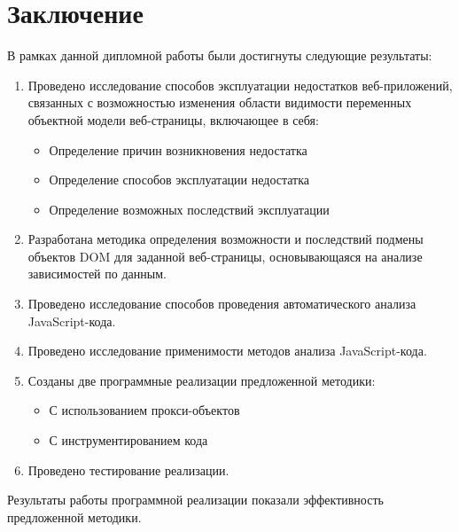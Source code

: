 
\chapter{Заключение}\label{Conclusion}

В рамках данной дипломной работы были достигнуты следующие результаты:

\begin{enumerate}
	\item Проведено исследование способов эксплуатации недостатков веб-приложений, связанных с возможностью изменения области видимости переменных объектной модели веб-страницы, включающее в себя:
		\begin{itemize}
			\item Определение причин возникновения недостатка
			\item Определение способов эксплуатации недостатка
			\item Определение возможных последствий эксплуатации
		\end{itemize}

	\item Разработана методика определения возможности и последствий подмены объектов DOM для заданной веб-страницы, основывающаяся на анализе зависимостей по данным.
	\item Проведено исследование способов проведения автоматического анализа Java\-Script-кода.
	\item Проведено исследование применимости методов анализа JavaScript-кода.
	\item Созданы две программные реализации предложенной методики:
		\begin{itemize}
			\item С использованием прокси-объектов
			\item С инструментированием кода
		\end{itemize}
	\item Проведено тестирование реализации.
\end{enumerate}

Результаты работы программной реализации показали эффективность предложенной методики.